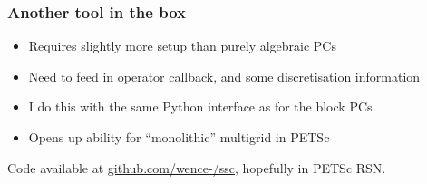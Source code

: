 \documentclass[presentation,aspectratio=43]{beamer}
\begin{document}
\begin{frame}
  \frametitle{Another tool in the box}
  \begin{itemize}
  \item Requires slightly more setup than purely algebraic PCs
  \item Need to feed in operator callback, and some discretisation information
  \item I do this with the same Python interface as for the block PCs
  \item Opens up ability for ``monolithic'' multigrid in PETSc
  \end{itemize}

  Code available at \url{github.com/wence-/ssc}, hopefully in PETSc RSN.
\end{frame}

\end{document}
